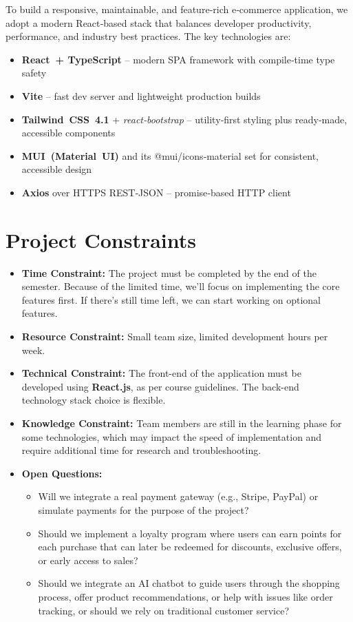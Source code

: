 \documentclass[a4paper,12pt]{article}
\begin{document}
To build a responsive, maintainable, and feature‑rich e‑commerce
application, we adopt a modern React‑based stack that balances developer
productivity, performance, and industry best practices.  
The key technologies are:

\begin{itemize}
	\item \textbf{React + TypeScript} – modern SPA framework with compile‑time type safety
	\item \textbf{Vite} – fast dev server and lightweight production builds
	\item \textbf{Tailwind CSS 4.1} + \textit{react‑bootstrap} – utility‑first styling plus ready‑made, accessible components
	\item \textbf{MUI (Material UI) }and its @mui/icons‑material set for consistent, accessible design
	\item \textbf{Axios} over HTTPS REST‑JSON – promise‑based HTTP client
\end{itemize}


\section{Project Constraints}
	\begin{itemize}
		\item \textbf{Time Constraint:}  The project must be completed by the end of the semester.
		Because of the limited time, we'll focus on implementing the core features first. If there's
		still time left, we can start working on optional features.
		\item \textbf{Resource Constraint:} Small team size, limited development hours per week.
		\item \textbf{Technical Constraint:} The front-end of the application must be \\ developed using
		\textbf{React.js}, as per course guidelines. The back-end \\ technology stack choice is flexible.
		\item \textbf{Knowledge Constraint:} Team members are still in the learning phase for some
		technologies, which may impact the speed of implementation and require additional time for
		research and troubleshooting.
		\item \textbf{Open Questions:}
		\begin{itemize}
			\item Will we integrate a real payment gateway (e.g., Stripe, PayPal) or simulate payments
			for the purpose of the project?
			\item Should we implement a loyalty program where users can earn points for each purchase
			that can later be redeemed for discounts, exclusive offers, or early access to sales?
			\item Should we integrate an AI chatbot to guide users through the shopping process, offer
			product recommendations, or help with issues like order tracking, or should we rely on
			traditional customer service?
		\end{itemize}
	\end{itemize}
\end{document}
